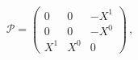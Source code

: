 \begin{equation}
\mathcal{P}=\left( \begin{array}{ccc} 0&0&-X^1\\
0&0&-X^0\\ X^1&X^0&0 \end{array} \right)\,,
\label{Pfree}
\end{equation}

